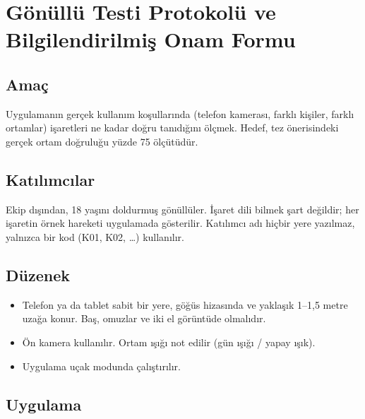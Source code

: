 \section{Gönüllü Testi Protokolü ve Bilgilendirilmiş Onam Formu}
\label{EK:Gonullu}

\subsection*{Amaç}

Uygulamanın gerçek kullanım koşullarında (telefon kamerası, farklı kişiler, farklı
ortamlar) işaretleri ne kadar doğru tanıdığını ölçmek. Hedef, tez önerisindeki
\sol gerçek ortam doğruluğu yüzde 75\sag{} ölçütüdür.

\subsection*{Katılımcılar}

Ekip dışından, 18 yaşını doldurmuş gönüllüler. İşaret dili bilmek şart değildir;
her işaretin örnek hareketi uygulamada gösterilir. Katılımcı adı hiçbir yere yazılmaz,
yalnızca bir kod (K01, K02, \ldots) kullanılır.

\subsection*{Düzenek}

\begin{itemize}
  \item Telefon ya da tablet sabit bir yere, göğüs hizasında ve yaklaşık 1--1,5 metre
        uzağa konur. Baş, omuzlar ve iki el görüntüde olmalıdır.
  \item Ön kamera kullanılır. Ortam ışığı not edilir (gün ışığı / yapay ışık).
  \item Uygulama uçak modunda çalıştırılır.
\end{itemize}

\subsection*{Uygulama}

